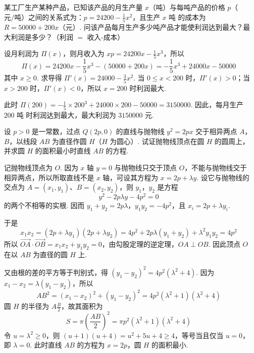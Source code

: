 \begin{problem}
某工厂生产某种产品，已知该产品的月生产量 \(x\)（\(\text{吨}\)）与每吨产品的价格 \(p\)（\(\text{元}/\text{吨}\)）之间的关系式为：\(p = 24200 - \frac{1}{5} x^2\)，且生产 \(x\text{ 吨}\) 的成本为 \(R = 50000 + 200x\)（\(\text{元}\)）. 问该产品每月生产多少吨产品才能使利润达到最大？最大利润是多少？（利润 \(=\) 收入-成本）
\end{problem}

\begin{solution}
设月利润为 \(\Pi(x)\)，则月收入为 \(xp=24200x-\frac15x^3\)，所以
\[
\Pi(x)=24200x-\frac15x^3-(50000+200x)=-\frac15x^3+24000x-50000
\]
其中 \(x\geqslant0\). 求导得 \(\Pi'(x)=24000-\frac35x^2\). 当 \(0\leqslant x<200\) 时，\(\Pi'(x)>0\)；当 \(x>200\) 时，\(\Pi'(x)<0\)，所以 \(x=200\) 时利润最大.

此时 \(\Pi(200)=-\frac15\times200^3+24000\times200-50000=3150000\). 因此，每月生产 \(200\text{ 吨}\) 时利润达到最大，最大利润为 \(3150000\text{ 元}\).
\end{solution}

\begin{problem}
设 \( p > 0 \) 是一常数，过点 \( Q(2p,0) \) 的直线与抛物线 \( y^{2} = 2px \) 交于相异两点 \(A\)，\(B\)，以线段 \(AB\) 为直径作圆 \(H\)（\(H\) 为圆心）. 试证抛物线顶点在圆 \(H\) 的圆周上，并求圆 \(H\) 的面积最小时直线 \(AB\) 的方程.
\end{problem}

\begin{solution}
记抛物线顶点为 \(O\). 因为 \(x\) 轴 \(y=0\) 与抛物线只交于顶点 \(O\)，不能与抛物线交于相异两点，所以所取直线不是 \(x\) 轴，可设其方程为 \(x=2p+\lambda y\). 设它与抛物线的交点为 \(A=(x_1,y_1)\)、\(B=(x_2,y_2)\)，则 \(y_1\)，\(y_2\) 是方程
\[
y^2-2p\lambda y-4p^2=0
\]
的两个不相等的实根. 因而 \(y_1+y_2=2p\lambda\)，\(y_1y_2=-4p^2\)，且 \(x_i=2p+\lambda y_i\).

于是
\[
x_1x_2=(2p+\lambda y_1)(2p+\lambda y_2)=4p^2+2p\lambda(y_1+y_2)+\lambda^2y_1y_2=4p^2
\]
所以 \(\overrightarrow{OA}\cdot\overrightarrow{OB}=x_1x_2+y_1y_2=0\)，由勾股定理的逆定理，\(OA\perp OB\). 因此顶点 \(O\) 在以 \(AB\) 为直径的圆 \(H\) 上.

又由根的差的平方等于判别式，得 \((y_1-y_2)^2=4p^2(\lambda^2+4)\). 因为 \(x_1-x_2=\lambda(y_1-y_2)\)，所以
\[
AB^2=(x_1-x_2)^2+(y_1-y_2)^2=4p^2(\lambda^2+1)(\lambda^2+4)
\]
圆 \(H\) 的半径为 \(A\frac{B}{2}\)，故其面积为
\[
S=\pi\left(\frac{AB}{2}\right)^2=\pi p^2(\lambda^2+1)(\lambda^2+4)
\]
令 \(u=\lambda^2\geqslant0\)，则 \((u+1)(u+4)=u^2+5u+4\geqslant4\)，等号当且仅当 \(u=0\)，即 \(\lambda=0\). 此时直线 \(AB\) 的方程为 \(x=2p\)，圆 \(H\) 的面积最小.
\end{solution}

